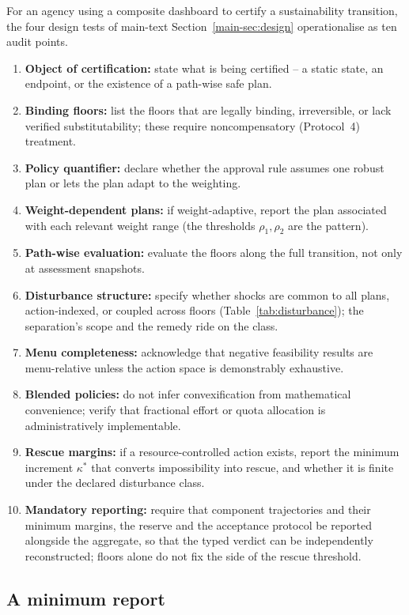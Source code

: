 For an agency using a composite dashboard to certify a sustainability transition, the four design tests of main-text Section~\ref{main-sec:design} operationalise as ten audit points.
\begin{enumerate}[leftmargin=2em]
\item \textbf{Object of certification:} state what is being certified -- a static state, an endpoint, or the existence of a path-wise safe plan.
\item \textbf{Binding floors:} list the floors that are legally binding, irreversible, or lack verified substitutability; these require noncompensatory (Protocol~4) treatment.
\item \textbf{Policy quantifier:} declare whether the approval rule assumes one robust plan or lets the plan adapt to the weighting.
\item \textbf{Weight-dependent plans:} if weight-adaptive, report the plan associated with each relevant weight range (the thresholds $\rho_1,\rho_2$ are the pattern).
\item \textbf{Path-wise evaluation:} evaluate the floors along the full transition, not only at assessment snapshots.
\item \textbf{Disturbance structure:} specify whether shocks are common to all plans, action-indexed, or coupled across floors (Table~\ref{tab:disturbance}); the separation's scope and the remedy ride on the class.
\item \textbf{Menu completeness:} acknowledge that negative feasibility results are menu-relative unless the action space is demonstrably exhaustive.
\item \textbf{Blended policies:} do not infer convexification from mathematical convenience; verify that fractional effort or quota allocation is administratively implementable.
\item \textbf{Rescue margins:} if a resource-controlled action exists, report the minimum increment $\kappa^*$ that converts impossibility into rescue, and whether it is finite under the declared disturbance class.
\item \textbf{Mandatory reporting:} require that component trajectories and their minimum margins, the reserve and the acceptance protocol be reported alongside the aggregate, so that the typed verdict can be independently reconstructed; floors alone do not fix the side of the rescue threshold.
\end{enumerate}

\subsection{A minimum report}

